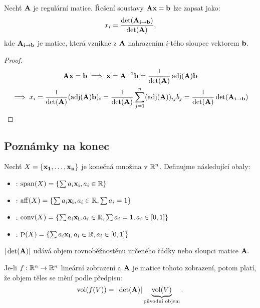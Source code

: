 \begin{theorem}
    Nechť $\mathbf{A}$ je regulární matice. Řešení soustavy $\mathbf{A}\mathbf{x}=\mathbf{b}$ lze zapsat
    jako:
    $$x_i = \frac{\det(\mathbf{A_{i\rightarrow\mathbf{b}}})}{\det(\mathbf{A})},$$
    kde $\mathbf{A_{i\rightarrow\mathbf{b}}}$ je matice, která vznikne z $\mathbf{A}$ 
    nahrazením $i$-tého sloupce vektorem $\mathbf{b}$.
\end{theorem}

\begin{proof}
    \begin{multline*}
        \mathbf{A}\mathbf{x}=\mathbf{b} \implies \mathbf{x} = \mathbf{A^{-1}}\mathbf{b} = \frac{1}{\det(\mathbf{A})} \mathop{\mathrm{adj}}(\mathbf{A})\mathbf{b} \\
        \implies x_i = \frac{1}{\det(\mathbf{A})}(\mathop{\mathrm{adj}}(\mathbf{A})\mathbf{b})_i = \frac{1}{\det(\mathbf{A})}
        \sum_{j=1}^n(\mathop{\mathrm{adj}}(\mathbf{A}))_{ij}b_j = \frac{1}{\det(\mathbf{A})} 
        \det(\mathbf{A_{i\rightarrow\mathbf{b}}})
    \end{multline*}
\end{proof}

\subsection{Poznámky na konec}

\begin{remark}
    Nechť $X = \{\mathbf{x_1}, \dots, \mathbf{x_n}\}$ je konečná množina v $\mathbb{R}^n$. Definujme
    následující obaly:
    \begin{itemize}
        \item {}: $\mathop{\mathrm{span}}(X) = \left\{ \sum a_i\mathbf{x_i}, a_i 
            \in \mathbb{R} \right\}$
        \item {}: $\mathop{\mathrm{aff}}(X) = \left\{ \sum a_i\mathbf{x_i}, a_i 
            \in \mathbb{R}, \sum a_i = 1 \right\}$ 
        \item {}: $\mathop{\mathrm{conv}}(X) = \left\{ \sum a_i\mathbf{x_i}, a_i 
            \in \mathbb{R}, \sum a_i = 1, a_i \in [0,1] \right\}$ 
        \item {}: $\mathop{\mathrm{P}}(X) = \left\{ 
                \sum a_i\mathbf{x_i}, a_i \in \mathbb{R}, a_i \in [0,1] \right\}$
    \end{itemize}
\end{remark}

\begin{remark}
    $|\det(\mathbf{A})|$ udává objem rovnoběžnostěnu určeného řádky nebo sloupci
    matice $\mathbf{A}.$
\end{remark}

\begin{observation}
    Je-li $f: \mathbb{R}^n \rightarrow \mathbb{R}^n$ lineární zobrazení a $\mathbf{A}$ je matice tohoto
    zobrazení, potom platí, že objem těles se mění podle předpisu:
    $$ \mathop{\mathrm{vol}}(f(V)) = |\det({\mathbf{A}})| 
    \underbrace{\mathop{\mathrm{vol}}(V)}_{\text{původní objem}}.$$
\end{observation}

